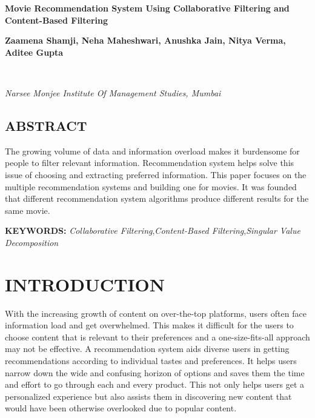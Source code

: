 \documentclass[a4paper,10pt]{article}
\begin{document}
\noindent 
\begin{center}
\textbf{{\Large Movie Recommendation System Using Collaborative Filtering and Content-Based Filtering}} \\
\end{center}

\noindent 
\begin{center}
\textbf{ Zaamena Shamji, Neha Maheshwari, Anushka Jain, Nitya Verma, Aditee Gupta } 
\end{center}\\[-0.5cm]

\begin{center}
\textit{Narsee Monjee Institute Of Management Studies, Mumbai}\\
\end{center}


\noindent 
\begin{center}
    \subsection*{ABSTRACT}
        The growing volume of data and information overload makes it burdensome for people to filter relevant information. Recommendation system helps solve this issue of choosing and extracting preferred information. This paper focuses on the multiple recommendation systems and building one for movies. It was founded that different recommendation system algorithms produce different results for the same movie. 


\noindent 
\textbf{KEYWORDS:} \textit{Collaborative Filtering},\textit{Content-Based Filtering},\textit{Singular Value Decomposition}
\end{center}

\section{INTRODUCTION}
With the increasing growth of content on over-the-top platforms, users often face information load and get overwhelmed. This makes it difficult for the users to choose content that is relevant to their preferences and a one-size-fits-all approach may not be effective. A recommendation system aids diverse users in getting recommendations according to individual tastes and preferences. It helps users narrow down the wide and confusing horizon of options and saves them the time and effort to go through each and every product. This not only helps users get a personalized experience but also assists them in discovering new content that would have been otherwise overlooked due to popular content.
\end{document}
